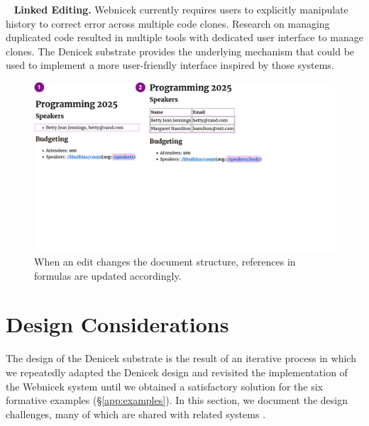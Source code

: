 \documentclass[sigconf,anonymous,screen]{acmart}
\DeclareRobustCommand{\keyideabox}[3]{\begin{tcolorbox}[breakable,
  boxsep=5pt,left=0pt,right=0pt,top=0pt,bottom=0pt,width=\dimexpr\columnwidth\relax,
  colback=gray!20,colframe=gray!20,
  enlarge bottom by=0pt,enlarge top by=0pt,
  arc=0pt,outer arc=0pt]
\lettrine[lraise=0.3]{\LARGE #1}{~}
\small \textbf{#2.} #3
\end{tcolorbox}
}
\begin{document}
\keyideabox{\faClipboard}{Linked Editing}{Webnicek currently requires users to explicitly
manipulate history to correct error across multiple code clones. Research on managing duplicated
code resulted in multiple tools \cite{toomim-2004-linked,duala-ekoko-2008-clone} with dedicated
user interface to manage clones. The Denicek substrate provides the underlying mechanism that
could be used to implement a more user-friendly interface inspired by those systems.}


\begin{figure}[t]
\includegraphics[width=0.9\columnwidth,clip,trim=0cm 9.5cm 8cm 0cm]{fig/coevolution.pdf}
\caption{When an edit changes the document structure, references in formulas are updated accordingly.}
\label{fig:coevolution}
\vspace{-1em}
\end{figure}


\section{Design Considerations}
\label{sec:discuss}

The design of the Denicek substrate is the result of an iterative process in which we repeatedly
adapted the Denicek design and revisited the implementation of the Webnicek system until we obtained
a satisfactory solution for the six formative examples (\S\ref{app:examples}). In this section, we
document the design challenges, many of which are shared with related systems
\cite{jakubovic-2022-ladder,edwards-2005-subtext,hall-2017-infra,omar-2021-livelits}.
\end{document}
